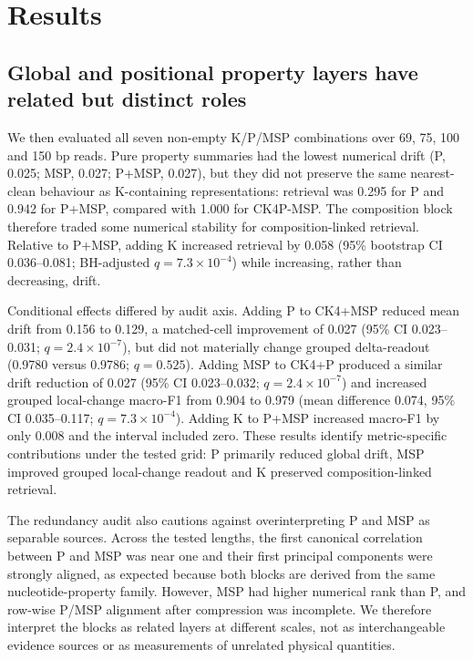 \FloatBarrier
\section{Results}

\subsection{Global and positional property layers have related but distinct roles}

We then evaluated all seven non-empty K/P/MSP combinations over 69, 75, 100 and 150 bp reads. Pure property summaries had the lowest numerical drift (P, 0.025; MSP, 0.027; P+MSP, 0.027), but they did not preserve the same nearest-clean behaviour as K-containing representations: retrieval was 0.295 for P and 0.942 for P+MSP, compared with 1.000 for CK4P-MSP. The composition block therefore traded some numerical stability for composition-linked retrieval. Relative to P+MSP, adding K increased retrieval by 0.058 (95\% bootstrap CI 0.036--0.081; BH-adjusted $q=7.3\times10^{-4}$) while increasing, rather than decreasing, drift.

Conditional effects differed by audit axis. Adding P to CK4+MSP reduced mean drift from 0.156 to 0.129, a matched-cell improvement of 0.027 (95\% CI 0.023--0.031; $q=2.4\times10^{-7}$), but did not materially change grouped delta-readout (0.9780 versus 0.9786; $q=0.525$). Adding MSP to CK4+P produced a similar drift reduction of 0.027 (95\% CI 0.023--0.032; $q=2.4\times10^{-7}$) and increased grouped local-change macro-F1 from 0.904 to 0.979 (mean difference 0.074, 95\% CI 0.035--0.117; $q=7.3\times10^{-4}$). Adding K to P+MSP increased macro-F1 by only 0.008 and the interval included zero. These results identify metric-specific contributions under the tested grid: P primarily reduced global drift, MSP improved grouped local-change readout and K preserved composition-linked retrieval.

The redundancy audit also cautions against overinterpreting P and MSP as separable sources. Across the tested lengths, the first canonical correlation between P and MSP was near one and their first principal components were strongly aligned, as expected because both blocks are derived from the same nucleotide-property family. However, MSP had higher numerical rank than P, and row-wise P/MSP alignment after compression was incomplete. We therefore interpret the blocks as related layers at different scales, not as interchangeable evidence sources or as measurements of unrelated physical quantities.

